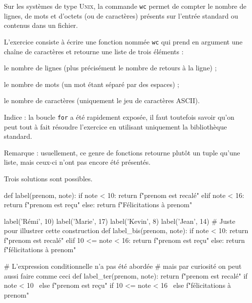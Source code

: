 \begin{exercise}[title={Comptage au sein des chaînes}, level=basic]
Sur les systèmes de type \textsc{Unix}, la commande \texttt{wc} permet de compter le nombre de lignes, de mots et d'octets (ou de caractères) présents sur l'entrée standard ou contenus dans un fichier.

L'exercice consiste à écrire une fonction nommée \texttt{wc} qui prend en argument une chaîne de caractères et retourne une liste de trois éléments :
\begin{jazzitemize}
\item le nombre de lignes (plus précisément le nombre de retours à la ligne) ;
\item le nombre de mots (un mot étant séparé par des espaces) ;
\item le nombre de caractères (uniquement le jeu de caractères ASCII).
\end{jazzitemize}

\noindent Indice : la boucle \texttt{for} a été rapidement exposée, il faut toutefois savoir qu'on peut tout à fait résoudre l'exercice en utilisant uniquement la bibliothèque standard.

\noindent Remarque : usuellement, ce genre de fonctions retourne plutôt un tuple qu'une liste, mais ceux-ci n'ont pas encore été présentés.
\end{exercise}

\begin{solution}
Trois solutions sont possibles.
\begin{idleconsole}
\begin{pyconsole}
def label(prenom, note):
    if note < 10:
        return f"{prenom} est recalé"
    elif note < 16:
        return f"{prenom} est reçu"
    else:
        return f"Félicitations à {prenom}"

label('Rémi', 10)
label('Marie', 17)
label('Kevin', 8)
label('Jean', 14)
# Juste pour illustrer cette construction
def label_bis(prenom, note):
    if note < 10:
        return f"{prenom} est recalé"
    elif 10 <= note < 16:
        return f"{prenom} est reçu"
    else:
        return f"félicitations à {prenom}"

# L'expression conditionnelle n'a pas été abordée
# mais par curiosité on peut aussi faire comme ceci
def label_ter(prenom, note):
    return f"{prenom} est recalé" if note < 10 \
    else f"{prenom} est reçu" if 10 <= note < 16 \
    else f"félicitations à {prenom}"

\end{pyconsole}
\end{idleconsole}
\end{solution}

